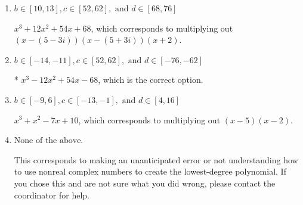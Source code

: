 \documentclass{extbook}[14pt]
\begin{document}
\begin{enumerate}
{\begin{enumerate}[label=\Alph*.]
$x^{3} + x^{2} +x -6$, which corresponds to multiplying out $(x + 3)(x -2)$.
\item \( b \in [10, 13], c \in [52, 62], \text{ and } d \in [68, 76] \)

$x^{3} +12 x^{2} +54 x + 68$, which corresponds to multiplying out $(x-(5 - 3 i))(x-(5 + 3 i))(x + 2)$.
\item \( b \in [-14, -11], c \in [52, 62], \text{ and } d \in [-76, -62] \)

* $x^{3} -12 x^{2} +54 x -68$, which is the correct option.
\item \( b \in [-9, 6], c \in [-13, -1], \text{ and } d \in [4, 16] \)

$x^{3} + x^{2} -7 x + 10$, which corresponds to multiplying out $(x -5)(x -2)$.
\item \( \text{None of the above.} \)

This corresponds to making an unanticipated error or not understanding how to use nonreal complex numbers to create the lowest-degree polynomial. If you chose this and are not sure what you did wrong, please contact the coordinator for help.
\end{enumerate}

}
\end{enumerate}
\end{document}
